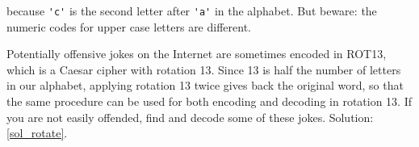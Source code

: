 \begin{exercise}
because \verb"'c'" is the second letter after \verb"'a'" in 
the alphabet.  But beware: the numeric codes for upper case 
letters are different.

Potentially offensive jokes on the Internet are sometimes 
encoded in ROT13, which is a Caesar cipher with rotation 13. 
Since 13 is half the number of letters in our alphabet, 
applying rotation 13 twice gives back the original word, 
so that the same procedure can be used for both encoding 
and decoding in rotation 13. If you are not
easily offended, find and decode some of these jokes.  Solution: \ref{sol_rotate}.

\end{exercise}

